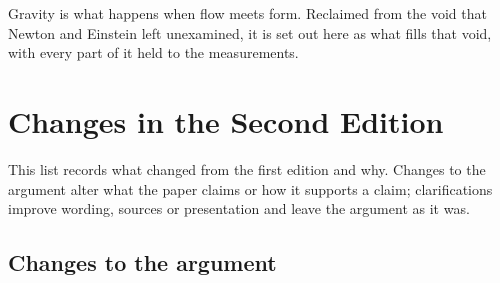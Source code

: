 Gravity is what happens when flow meets form. Reclaimed from the void that Newton and Einstein left unexamined, it is set out here as what fills that void, with every part of it held to the measurements.

\clearpage
\section*{Changes in the Second Edition}

This list records what changed from the first edition and why. Changes to the argument alter what the paper claims or how it supports a claim; clarifications improve wording, sources or presentation and leave the argument as it was.

\subsection*{Changes to the argument}
